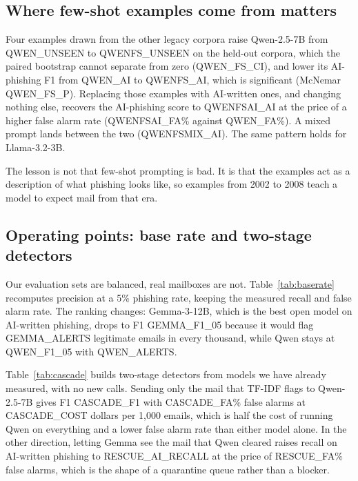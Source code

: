 

\subsection{Where few-shot examples come from matters}

Four examples drawn from the other legacy corpora raise Qwen-2.5-7B from
QWEN_UNSEEN to QWENFS_UNSEEN on the held-out corpora, which the paired
bootstrap cannot separate from zero (QWEN_FS_CI), and lower its AI-phishing F1
from QWEN_AI to QWENFS_AI, which is significant (McNemar QWEN_FS_P). Replacing
those examples with AI-written ones, and changing nothing else, recovers the
AI-phishing score to QWENFSAI_AI at the price of a higher false alarm rate
(QWENFSAI_FA\% against QWEN_FA\%). A mixed prompt lands between the two
(QWENFSMIX_AI). The same pattern holds for Llama-3.2-3B.

The lesson is not that few-shot prompting is bad. It is that the examples act
as a description of what phishing looks like, so examples from 2002 to 2008
teach a model to expect mail from that era.

\subsection{Operating points: base rate and two-stage detectors}

Our evaluation sets are balanced, real mailboxes are not.
Table~\ref{tab:baserate} recomputes precision at a 5\% phishing rate, keeping
the measured recall and false alarm rate. The ranking changes: Gemma-3-12B,
which is the best open model on AI-written phishing, drops to F1 GEMMA_F1_05
because it would flag GEMMA_ALERTS legitimate emails in every thousand, while
Qwen stays at QWEN_F1_05 with QWEN_ALERTS.

Table~\ref{tab:cascade} builds two-stage detectors from models we have already
measured, with no new calls. Sending only the mail that TF-IDF flags to
Qwen-2.5-7B gives F1 CASCADE_F1 with CASCADE_FA\% false alarms at
CASCADE_COST dollars per 1{,}000 emails, which is half the cost of running Qwen
on everything and a lower false alarm rate than either model alone. In the
other direction, letting Gemma see the mail that Qwen cleared raises recall on
AI-written phishing to RESCUE_AI_RECALL at the price of RESCUE_FA\% false alarms,
which is the shape of a quarantine queue rather than a blocker.




